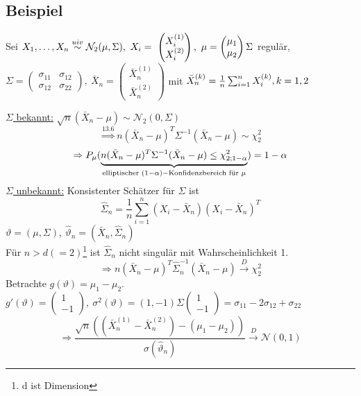 \documentclass[a4paper,11pt,twoside,titlepage]{article}
\newcommand\NN{ \mathcal{N} } %
\newcommand{\uiv}{\ensuremath{\stackrel{uiv}{\sim}}}
\begin{document}
\subsection{Beispiel}%
Sei $X_1,\ldots,X_n\uiv\NN_2(\mu,\Sigma),\ X_i=\ \begin{pmatrix}X_i^{(1)}\\X_i^{(2)}\end{pmatrix},\ 
\mu=\begin{pmatrix}\mu_1\\\mu_2\end{pmatrix}\\
\Sigma$ regulär, $\Sigma=\begin{pmatrix}\sigma_{11}&\sigma_{12}\\\sigma_{12}&\sigma_{22}\end{pmatrix},\ \bar{X}_n=
\begin{pmatrix}\bar{X}_n^{(1)}\\\bar{X}_n^{(2)}\end{pmatrix}$ mit
$\bar{X}_n^{(k)}=\frac1n\sum_{i=1}^nX_i^{(k)},\\ k=1,2$

\underline{$\Sigma$ bekannt:} $\sqrt{n}(\bar{X}_n-\mu)\sim\NN_2(0,\Sigma)$
$$\stackrel{13.6}{\Rightarrow}n(\bar{X}_n-\mu)^T\Sigma^{-1}(\bar{X}_n-\mu)\sim\chi_2^2$$
$$\Rightarrow P_\mu(\underbrace{n(\bar{X}_n-\mu)^T\Sigma^{-1}(\bar{X}_n-\mu)\leq\chi^2_{2;1-\alpha}}_{
\textnormal{elliptischer }(1-\alpha)-\textnormal{Konfidenzbereich für }\mu})= 1-\alpha$$
\underline{$\Sigma$ unbekannt:} Konsistenter Schätzer für $\Sigma$ ist $$\hat{\Sigma}_n=\frac1n\sum_{i=1}^n(X_i-\bar{X}_n)(X_i-\bar{X}_n)^T$$
$\vartheta=(\mu,\Sigma),\ \hat\vartheta_n=(\bar{X}_n,\hat\Sigma_n)$\\
Für $n>d(=2)$\footnote{d ist Dimension} ist $\hat\Sigma_n$ nicht singulär mit
Wahrscheinlichkeit 1. $$\Rightarrow n(\bar{X}_n-\mu)^T\hat\Sigma_n^{-1}(\bar{X}_n-\mu)\stackrel{D}{\rightarrow}\chi_2^2$$
Betrachte $g(\vartheta)=\mu_1-\mu_2$.\\
$g'(\vartheta)=\begin{pmatrix}1\\-1\end{pmatrix},\ \sigma^2(\vartheta)=(1,-1)\Sigma\begin{pmatrix}1\\-1\end{pmatrix}=\sigma_{11}-2\sigma_{12}+\sigma_{22}$
\[\Rightarrow\frac{\sqrt{n}((\bar{X}_n^{(1)}-\bar{X}_n^{(2)})-(\mu_1-\mu_2))}{\sigma(\hat\vartheta_n)}\stackrel{D}{\rightarrow}\NN(0,1)\]
\end{document}
